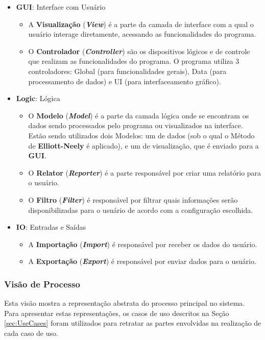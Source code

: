 \documentclass[12pt]{article}
\begin{document}
\begin{itemize}
	\item \textbf{GUI}: Interface com Usuário
	\begin{itemize}
		\item A \textbf{Visualização} (\textbf{\textit{View}}) é a parte da camada de interface com a qual o usuário interage diretamente, acessando as funcionalidades do programa.
		\item O \textbf{Controlador} (\textbf{\textit{Controller}}) são os dispositivos lógicos e de controle que realizam as funcionalidades do programa. O programa utiliza 3 controladores: Global (para funcionalidades gerais), Data (para processamento de dados) e UI (para interfaceamento gráfico).
	\end{itemize}
	\item \textbf{Logic}: Lógica
	\begin{itemize}
		\item O \textbf{Modelo} (\textbf{\textit{Model}}) é a parte da camada lógica onde se encontram os dados sendo processados pelo programa ou visualizados na interface. Estão sendo utilizados dois Modelos: um de dados (sob o qual o Método de \textbf{Elliott-Neely} é aplicado), e um de visualização, que é enviado para a \textbf{GUI}.
		\item O \textbf{Relator} (\textbf{\textit{Reporter}}) é a parte responsável por criar uma relatório para o usuário.
		\item O \textbf{Filtro} (\textbf{\textit{Filter}}) é responsável por filtrar quais informações serão disponibilizadas para o usuário de acordo com a configuração escolhida.
	\end{itemize}
	\item \textbf{IO}: Entradas e Saídas
	\begin{itemize}
		\item A \textbf{Importação} (\textbf{\textit{Import}}) é responsável por receber os dados do usuário.
		\item A \textbf{Exportação} (\textbf{\textit{Export}}) é responsável por enviar dados para o usuário.
	\end{itemize}
\end{itemize}


\subsubsection{Visão de Processo}

Esta visão mostra a representação abstrata do processo principal no sistema. Para apresentar
estas representações, os casos de uso descritos na Seção \ref{sec:UseCases} foram utilizados
para retratar as partes envolvidas na realização de cada caso de uso.
\end{document}
